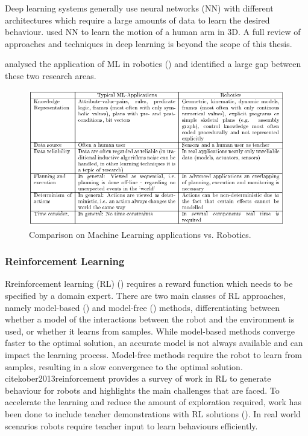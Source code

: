 Deep learning systems generally use neural networks (NN) with different architectures which require a large amounts of data to learn the desired behaviour.
\cite{billard2001robust} used NN to learn the motion of a human arm in 3D.
\cite{schmidhuber2015deep} A full review of approaches and techniques in deep learning is beyond the scope of this thesis.

\cite{Kreuziger1992} analysed the application of ML in robotics () and identified a large gap between these two research areas.
\begin{figure}[h]
	\centering
	\includegraphics[width=\linewidth]{figures/Kreuziger1992-Comparison ML Robotics}
	\caption{Comparison on Machine Learning applications vs. Robotics. \cite{Kreuziger1992}}
	\label{fig:MLvsRobotics}
\end{figure} 

\subsubsection{Reinforcement Learning}
Rreinforcement learning (RL) (\cite{sutton1998reinforcement,kaelbling1996reinforcement,gosavi2009reinforcement}) requires a reward function which needs to be specified by a domain expert.
There are two main classes of RL approaches, namely model-based (\cite{polydoros2017survey}) and model-free (\cite{kober2013reinforcement}) methods, differentiating between whether a model of the interactions between the robot and the environment is used, or whether it learns from samples.
While model-based methods converge faster to the optimal solution, an accurate model is not always available and can impact the learning process.
Model-free methods require the robot to learn from samples, resulting in a slow convergence to the optimal solution.
cite{kober2013reinforcement} provides a survey of work in RL to generate behaviour for robots and highlights the main challenges that are faced.
To accelerate the learning and reduce the amount of exploration required, work has been done to include teacher demonstrations with RL solutions (\cite{martinez2017relational,hester2017learning}).
In real world scenarios robots require teacher input to learn behaviours efficiently. 


